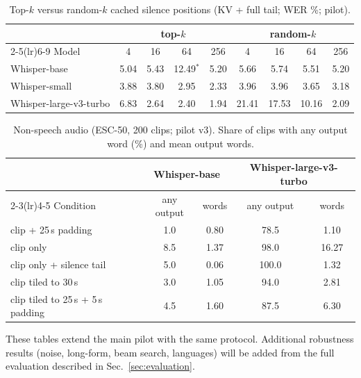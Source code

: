 \begin{table}[!htbp]
\centering
\small
\setlength{\tabcolsep}{6pt}
\caption{Top-$k$ versus random-$k$ cached silence positions (KV + full tail; WER \%; pilot).}
\label{tab:topk-full}
\begin{tabular}{l cccc cccc}
\toprule
 & \multicolumn{4}{c}{\textbf{top-$k$}} & \multicolumn{4}{c}{\textbf{random-$k$}} \\
\cmidrule(lr){2-5}\cmidrule(lr){6-9}
Model & 4 & 16 & 64 & 256 & 4 & 16 & 64 & 256 \\
\midrule
Whisper-base & 5.04 & 5.43 & 12.49$^\ast$ & 5.20 & 5.66 & 5.74 & 5.51 & 5.20 \\
Whisper-small & 3.88 & 3.80 & 2.95 & 2.33 & 3.96 & 3.96 & 3.65 & 3.18 \\
Whisper-large-v3-turbo & 6.83 & 2.64 & 2.40 & 1.94 & 21.41 & 17.53 & 10.16 & 2.09 \\
\bottomrule
\end{tabular}

\vspace{2pt}{\footnotesize $^\ast$Single outlier cell, to be re-checked at scale.}
\end{table}

\begin{table}[!htbp]
\centering
\small
\setlength{\tabcolsep}{6pt}
\caption{Non-speech audio (ESC-50, 200 clips; pilot v3). Share of clips with any output word (\%) and mean output words.}
\label{tab:esc}
\begin{tabular}{l cc cc}
\toprule
 & \multicolumn{2}{c}{\textbf{Whisper-base}} & \multicolumn{2}{c}{\textbf{Whisper-large-v3-turbo}} \\
\cmidrule(lr){2-3}\cmidrule(lr){4-5}
Condition & any output & words & any output & words \\
\midrule
clip + 25\,s padding & 1.0 & 0.80 & 78.5 & 1.10 \\
clip only & 8.5 & 1.37 & 98.0 & 16.27 \\
clip only + silence tail & 5.0 & 0.06 & 100.0 & 1.32 \\
clip tiled to 30\,s & 3.0 & 1.05 & 94.0 & 2.81 \\
clip tiled to 25\,s + 5\,s padding & 4.5 & 1.60 & 87.5 & 6.30 \\
\bottomrule
\end{tabular}
\end{table}

These tables extend the main pilot with the same protocol. Additional robustness results (noise, long-form, beam search, languages) will be added from the full evaluation described in Sec.~\ref{sec:evaluation}.
